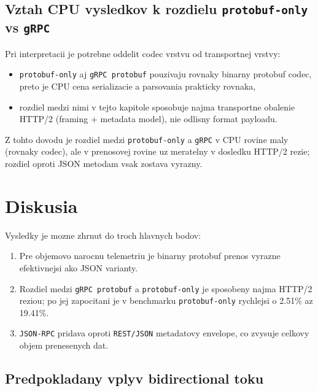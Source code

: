 \documentclass[12pt,a4paper]{report}
\begin{document}
\subsection{Vztah CPU vysledkov k rozdielu \texttt{protobuf-only} vs \texttt{gRPC}}

Pri interpretacii je potrebne oddelit codec vrstvu od transportnej vrstvy:
\begin{itemize}
  \item \texttt{protobuf-only} aj \texttt{gRPC protobuf} pouzivaju rovnaky
  binarny protobuf codec, preto je CPU cena serializacie a parsovania
  prakticky rovnaka,
  \item rozdiel medzi nimi v tejto kapitole sposobuje najma transportne
  obalenie HTTP/2 (framing + metadata model), nie odlisny format payloadu.
\end{itemize}

Z tohto dovodu je rozdiel medzi \texttt{protobuf-only} a \texttt{gRPC}
v CPU rovine maly (rovnaky codec), ale v prenosovej rovine uz meratelny
v dosledku HTTP/2 rezie; rozdiel oproti JSON metodam vsak zostava vyrazny.

\section{Diskusia}

Vysledky je mozne zhrnut do troch hlavnych bodov:
\begin{enumerate}
  \item Pre objemovo narocnu telemetriu je binarny protobuf prenos
  vyrazne efektivnejsi ako JSON varianty.
  \item Rozdiel medzi \texttt{gRPC protobuf} a \texttt{protobuf-only}
  je sposobeny najma HTTP/2 reziou; po jej zapocitani je v benchmarku
  \texttt{protobuf-only} rychlejsi o 2.51\% az 19.41\%.
  \item \texttt{JSON-RPC} pridava oproti \texttt{REST/JSON}
  metadatovy envelope, co zvysuje celkovy objem prenesenych dat.
\end{enumerate}

\subsection{Predpokladany vplyv bidirectional toku}
\end{document}
